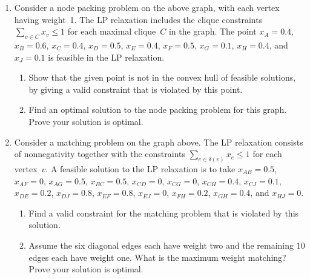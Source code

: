 \documentclass[12pt]{article}
\begin{document}
\begin{enumerate}
\item  \label{q.nodepack}
Consider a node packing problem on the above graph, with each vertex having weight~1.
The LP relaxation includes the clique constraints $\sum_{v \in C} x_v \leq 1$
for each maximal clique~$C$ in the graph.
The point $x_A=0.4$, $x_B=0.6$, $x_C=0.4$, $x_D=0.5$, $x_E=0.4$,
$x_F=0.5$, $x_G=0.1$, $x_H=0.4$, and $x_J=0.1$
is feasible in the LP relaxation.
\begin{enumerate}
\item Show that the given point is not in the convex hull of feasible solutions,
by giving a valid constraint that is violated by this point.
\item Find an optimal solution to the node packing problem for this graph.
Prove your solution is optimal.
\end{enumerate}

\item \label{q.matching}
Consider a matching problem on the graph above.
The LP relaxation consists of nonnegativity together with the constraints
$\sum_{e \in \delta(v)}x_e \leq 1$ for each vertex~$v$.
A feasible solution to the LP relaxation is to take
$x_{AB}=0.5$, $x_{AF}=0$, $x_{AG}=0.5$, $x_{BC}=0.5$, $x_{CD}=0$, $x_{CG}=0$,
$x_{CH}=0.4$, $x_{CJ}=0.1$, $x_{DE}=0.2$, $x_{DJ}=0.8$,
$x_{EF}=0.8$, $x_{EJ}=0$, $x_{FH}=0.2$, $x_{GH}=0.4$, and $x_{HJ}=0$.
\begin{enumerate}
\item Find a valid constraint for the matching problem that is violated by this solution.
\item Assume the six diagonal edges each have weight two and the remaining 10 edges each
have weight one.
What is the maximum weight matching?
Prove your solution is optimal.
\end{enumerate}


\end{enumerate}
\end{document}
